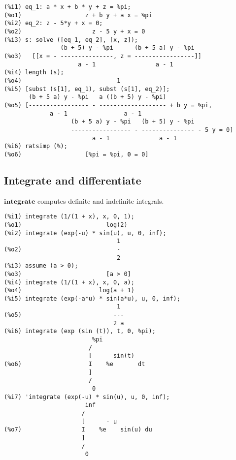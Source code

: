 \documentclass[12pt]{article}
\begin{document}
\begin{verbatim}
(%i1) eq_1: a * x + b * y + z = %pi;
(%o1)                  z + b y + a x = %pi
(%i2) eq_2: z - 5*y + x = 0;
(%o2)                    z - 5 y + x = 0
(%i3) s: solve ([eq_1, eq_2], [x, z]);
                (b + 5) y - %pi      (b + 5 a) y - %pi
(%o3)   [[x = - ---------------, z = -----------------]]
                     a - 1                 a - 1
(%i4) length (s);
(%o4)                           1
(%i5) [subst (s[1], eq_1), subst (s[1], eq_2)];
       (b + 5 a) y - %pi   a ((b + 5) y - %pi)
(%o5) [----------------- - ------------------- + b y = %pi, 
             a - 1                a - 1
                   (b + 5 a) y - %pi   (b + 5) y - %pi
                   ----------------- - --------------- - 5 y = 0]
                         a - 1              a - 1
(%i6) ratsimp (%);
(%o6)                  [%pi = %pi, 0 = 0]
\end{verbatim}

\subsection{Integrate and differentiate}

$\mathbf{integrate}$ computes definite and indefinite integrals.

\begin{verbatim}
(%i1) integrate (1/(1 + x), x, 0, 1);
(%o1)                        log(2)
(%i2) integrate (exp(-u) * sin(u), u, 0, inf);
                                1
(%o2)                           -
                                2
(%i3) assume (a > 0);
(%o3)                        [a > 0]
(%i4) integrate (1/(1 + x), x, 0, a);
(%o4)                      log(a + 1)
(%i5) integrate (exp(-a*u) * sin(a*u), u, 0, inf);
                                1
(%o5)                          ---
                               2 a
(%i6) integrate (exp (sin (t)), t, 0, %pi);
                         %pi
                        /
                        [      sin(t)
(%o6)                   I    %e       dt
                        ]
                        /
                         0
(%i7) 'integrate (exp(-u) * sin(u), u, 0, inf);
                       inf
                      /
                      [      - u
(%o7)                 I    %e    sin(u) du
                      ]
                      /
                       0
\end{verbatim}
\end{document}
